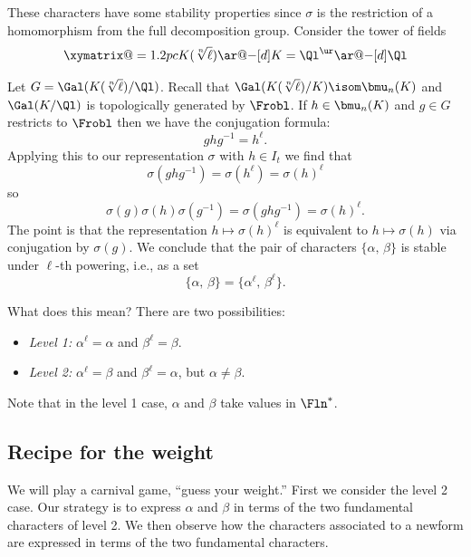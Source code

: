 \documentclass{report}
\begin{document}
These characters have some stability properties since $\sigma$ is
the restriction of a homomorphism from the full decomposition
group. Consider the tower of fields
$$\xymatrix@=1.2pc{
{K(\sqrt[n]{\ell})}\ar@{-}[d]\\
{K=\Ql^{\ur}}\ar@{-}[d]\\
{\Ql}}$$

Let $G=\Gal(K(\sqrt[n]{\ell})/\Ql)$.  Recall that
$\Gal(K(\sqrt[n]{\ell})/K)\isom\bmu_n(K)$ and
$\Gal(K/\Ql)$ is topologically generated by $\Frobl$.
If $h\in\bmu_n(K)$ and $g\in G$ restricts to $\Frobl$
then we have the conjugation formula:
   $$ghg^{-1}=h^\ell.$$
Applying this to our representation $\sigma$
with $h\in I_t$ we find that
$$\sigma(ghg^{-1})=\sigma(h^\ell)=\sigma(h)^\ell$$
so
$$\sigma(g)\sigma(h)\sigma(g^{-1})=\sigma(ghg^{-1})=\sigma(h)^\ell.$$
The point is that the representation
$h\mapsto\sigma(h)^\ell$ is equivalent to
$h\mapsto\sigma(h)$ via conjugation by $\sigma(g)$.
We conclude that the pair of characters
$\{\alpha,\,\beta\}$ is stable under $\ell$-th powering,
i.e., as a set
 $$\{\alpha,\,\beta\}=\{\alpha^\ell,\,\beta^\ell\}.$$

What does this mean?  There are two possibilities:
\begin{itemize}
\item {\em Level 1:} $\alpha^\ell=\alpha$ and $\beta^\ell=\beta$.
\item {\em Level 2:} $\alpha^{\ell}=\beta$ and $\beta^\ell=\alpha$,
but $\alpha\neq \beta$.
\end{itemize}
Note that in the level 1 case, $\alpha$ and $\beta$ take
values in $\Fln^*$.

\subsection{Recipe for the weight}
We will play a carnival game, ``guess your weight.''
First we consider the level 2 case.
Our strategy is to express  $\alpha$ and $\beta$
in terms of the two fundamental characters of level 2.
We then observe how the characters associated to a newform
are expressed in terms of the two fundamental characters.
\end{document}
